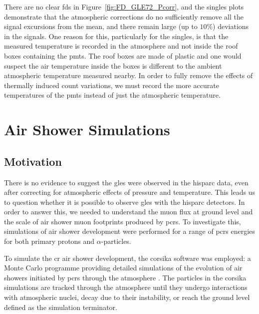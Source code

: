 There are no clear \glspl{fd} in Figure~\ref{fig:FD_GLE72_Pcorr}, and the singles plots demonstrate that the atmospheric corrections do no sufficiently remove all the signal excursions from the mean, and there remain large (up to $10\%$) deviations in the signals. One reason for this, particularly for the singles, is that the measured temperature is recorded in the atmosphere and not inside the roof boxes containing the \glspl{pmt}. The roof boxes are made of plastic and one would suspect the air temperature inside the boxes is different to the ambient atmospheric temperature measured nearby. In order to fully remove the effects of thermally induced count variations, we must record the more accurate temperatures of the \glspl{pmt} instead of just the atmospheric temperature.



\section{Air Shower Simulations}\label{sec:CORSIKA}

\subsection{Motivation}

There is no evidence to suggest the \glspl{gle} were observed in the \gls{hisparc} data, even after correcting for atmospheric effects of pressure and temperature. This leads us to question whether it is possible to observe \glspl{gle} with the \gls{hisparc} detectors. In order to answer this, we needed to understand the muon flux at ground level and the scale of air shower muon footprints produced by \glspl{pcr}. To investigate this, simulations of air shower development were performed for a range of \glspl{pcr} energies for both primary protons and $\alpha$-particles. 

To simulate the \gls{cr} air shower development, the \gls{corsika} software was employed: a Monte Carlo programme providing detailed simulations of the evolution of air showers initiated by \glspl{pcr} through the atmosphere \citep{heck_extensive_2017}. The particles in the \gls{corsika} simulations are tracked through the atmosphere until they undergo interactions with atmospheric nuclei, decay due to their instability, or reach the ground level defined as the simulation terminator.

